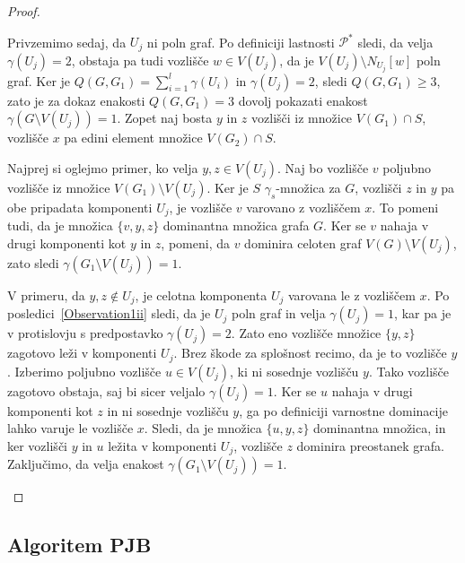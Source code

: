 \documentclass[12pt,a4paper,twoside]{article}
\theoremstyle{definition} %
\theoremstyle{plain} %
\numberwithin{equation}{section}  %
\begin{document}
\begin{proof}
\begin{itemize}
\medskip
Privzemimo sedaj, da $U_j$ ni poln graf. Po definiciji lastnosti $\mathcal{P^*}$ sledi, da velja $\gamma(U_j) = 2$, obstaja pa tudi vozlišče $w \in V(U_j)$, da je $V(U_j) \setminus N_{U_j}[w]$ poln graf. Ker je $Q(G, G_1) = \sum\limits_{i=1}^l \gamma(U_i)$ in $\gamma(U_j) = 2$, sledi $Q(G, G_1) \geq 3$, zato je za dokaz enakosti $Q(G, G_1) = 3$ dovolj pokazati enakost $\gamma(G \setminus V(U_j)) = 1$. Zopet naj bosta $y$ in $z$ vozlišči iz množice $V(G_1) \cap S$, vozlišče $x$ pa edini element množice  $V(G_2) \cap S$. 

Najprej si oglejmo primer, ko velja $y, z \in V(U_j)$. Naj bo vozlišče $v$ poljubno vozlišče iz množice $V(G_1) \setminus V(U_j)$. Ker je $S$ $\gamma_s$-množica za $G$, vozlišči $z$ in $y$ pa obe pripadata komponenti $U_j$, je vozlišče $v$ varovano z vozliščem $x$. To pomeni tudi, da je množica $\{v, y, z\}$ dominantna množica grafa $G$. Ker se $v$ nahaja v drugi komponenti kot $y$ in $z$, pomeni, da $v$ dominira celoten graf $V(G) \setminus V(U_j)$, zato sledi $\gamma(G_1 \setminus V(U_j)) = 1$.

V primeru, da $y, z \not\in U_j$, je celotna komponenta $U_j$ varovana le z vozliščem $x$. Po posledici~\ref{Observation1ii} sledi, da je $U_j$ poln graf in velja $\gamma(U_j) = 1$, kar pa je v protislovju s predpostavko $\gamma(U_j) = 2$. Zato eno vozlišče množice $\{y, z\}$ zagotovo leži v komponenti $U_j$. Brez škode za splošnost recimo, da je to vozlišče $y$. Izberimo poljubno vozlišče $u \in V(U_j)$, ki ni sosednje vozlišču $y$. Tako vozlišče zagotovo obstaja, saj bi sicer veljalo $\gamma(U_j) = 1$. Ker se $u$ nahaja v drugi komponenti kot $z$ in ni sosednje vozlišču $y$, ga po definiciji varnostne dominacije lahko varuje le vozlišče $x$. Sledi, da je množica $\{u, y, z\}$ dominantna množica, in ker vozlišči $y$ in $u$ ležita v komponenti $U_j$, vozlišče $z$ dominira preostanek grafa. Zaključimo, da velja enakost $\gamma(G_1 \setminus V(U_j)) = 1$. \qedhere
\end{itemize}
\end{proof}
 
 \subsection{Algoritem PJB}
 
\end{document}
